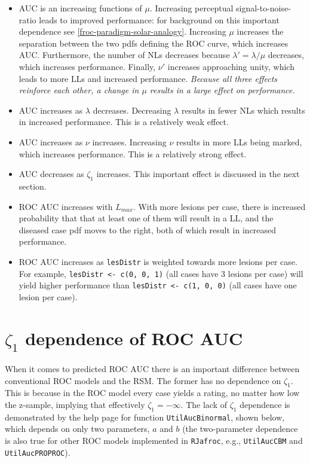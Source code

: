 \documentclass[
]{book}
\begin{document}
\begin{itemize}
\item
  AUC is an increasing functions of \(\mu\). Increasing perceptual signal-to-noise-ratio leads to improved performance: for background on this important dependence see \ref{froc-paradigm-solar-analogy}. Increasing \(\mu\) increases the separation between the two pdfs defining the ROC curve, which increases AUC. Furthermore, the number of NLs decreases because \(\lambda' = \lambda / \mu\) decreases, which increases performance. Finally, \(\nu'\) increases approaching unity, which leads to more LLs and increased performance. \emph{Because all three effects reinforce each other, a change in \(\mu\) results in a large effect on performance.}
\item
  AUC increases as \(\lambda\) decreases. Decreasing \(\lambda\) results in fewer NLs which results in increased performance. This is a relatively weak effect.
\item
  AUC increases as \(\nu\) increases. Increasing \(\nu\) results in more LLs being marked, which increases performance. This is a relatively strong effect.
\item
  AUC decreases as \(\zeta_1\) increases. This important effect is discussed in the next section.
\item
  ROC AUC increases with \(L_{max}\). With more lesions per case, there is increased probability that that at least one of them will result in a LL, and the diseased case pdf moves to the right, both of which result in increased performance.
\item
  ROC AUC increases as \texttt{lesDistr} is weighted towards more lesions per case. For example, \texttt{lesDistr\ \textless{}-\ c(0,\ 0,\ 1)} (all cases have 3 lesions per case) will yield higher performance than \texttt{lesDistr\ \textless{}-\ c(1,\ 0,\ 0)} (all cases have one lesion per case).
\end{itemize}

\hypertarget{rsm-pred-roc-curve-aucs-zeta1}{%
\section{\texorpdfstring{\(\zeta_1\) dependence of ROC AUC}{\textbackslash zeta\_1 dependence of ROC AUC}}\label{rsm-pred-roc-curve-aucs-zeta1}}

When it comes to predicted ROC AUC there is an important difference between conventional ROC models and the RSM. The former has no dependence on \(\zeta_1\). This is because in the ROC model every case yields a rating, no matter how low the z-sample, implying that effectively \(\zeta_1 = -\infty\). The lack of \(\zeta_1\) dependence is demonstrated by the help page for function \texttt{UtilAucBinormal}, shown below, which depends on only two parameters, \(a\) and \(b\) (the two-parameter dependence is also true for other ROC models implemented in \texttt{RJafroc}, e.g., \texttt{UtilAucCBM} and \texttt{UtilAucPROPROC}).
\end{document}
